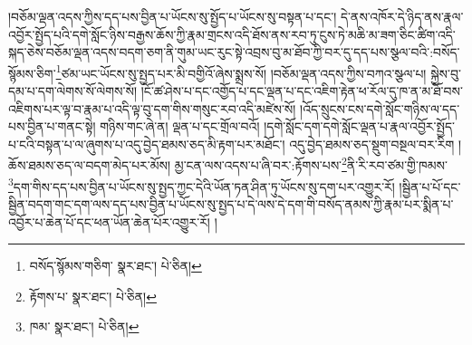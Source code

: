།བཅོམ་ལྡན་འདས་ཀྱིས་དད་པས་བྱིན་པ་ཡོངས་སུ་སྤྱོད་པ་ཡོངས་སུ་བསྟན་པ་དང་། དེ་ནས་འཁོར་དེ་ཉིད་ནས་རྣལ་འབྱོར་སྤྱོད་པའི་དགེ་སློང་ཉིས་བརྒྱས་ཆོས་ཀྱི་རྣམ་གྲངས་འདི་ཐོས་ནས་རབ་ཏུ་ངུས་ཏེ་མཆི་མ་ཟག་ཅིང་ཚིག་འདི་སྐད་ཅེས་བཅོམ་ལྡན་འདས་བདག་ཅག་ནི་གུམ་ཡང་རུང་སྟེ་འབྲས་བུ་མ་ཐོབ་ཀྱི་བར་དུ་དད་པས་སྩལ་བའི་:བསོད་སྙོམས་ཅིག་\footnote{བསོད་སྙོམས་གཅིག་  སྣར་ཐང་།  པེ་ཅིན། }ཙམ་ཡང་ཡོངས་སུ་སྤྱད་པར་མི་བགྱིའོ་ཞེས་སྨྲས་སོ། །བཅོམ་ལྡན་འདས་ཀྱིས་བཀའ་སྩལ་པ། སྐྱེས་བུ་དམ་པ་དག་ལེགས་སོ་ལེགས་སོ། །ངོ་ཚ་ཤེས་པ་དང་འགྱོད་པ་དང་ལྡན་པ་དང་འཇིག་རྟེན་ཕ་རོལ་དུ་ཁ་ན་མ་ཐོ་བས་འཇིགས་པར་ལྟ་བ་རྣམ་པ་འདི་ལྟ་བུ་དག་གིས་གསུང་རབ་འདི་མཛེས་སོ། །འོད་སྲུངས་ངས་དགེ་སློང་གཉིས་ལ་དད་པས་བྱིན་པ་གནང་སྟེ། གཉིས་གང་ཞེ་ན། ལྡན་པ་དང་གྲོལ་བའོ། །དགེ་སློང་དག་དགེ་སློང་ལྡན་པ་རྣལ་འབྱོར་སྤྱོད་པ་ངའི་བསྟན་པ་ལ་ཞུགས་པ་འདུ་བྱེད་ཐམས་ཅད་མི་རྟག་པར་མཐོང་། འདུ་བྱེད་ཐམས་ཅད་སྡུག་བསྔལ་བར་རིག །ཆོས་ཐམས་ཅད་ལ་བདག་མེད་པར་མོས། མྱ་ངན་ལས་འདས་པ་ཞི་བར་:རྟོགས་པས་\footnote{རྟོགས་པ་  སྣར་ཐང་།  པེ་ཅིན། }ནི་རི་རབ་ཙམ་གྱི་ཁམས་\footnote{ཁམ་  སྣར་ཐང་།  པེ་ཅིན། }དག་གིས་དད་པས་བྱིན་པ་ཡོངས་སུ་སྤྱད་ཀྱང་དེའི་ཡོན་ཏན་ཤིན་ཏུ་ཡོངས་སུ་དག་པར་འགྱུར་རོ། །སྦྱིན་པ་པོ་དང་སྦྱིན་བདག་གང་དག་ལས་དད་པས་བྱིན་པ་ཡོངས་སུ་སྤྱད་པ་དེ་ལས་དེ་དག་གི་བསོད་ནམས་ཀྱི་རྣམ་པར་སྨིན་པ་འབྱོར་པ་ཆེན་པོ་དང་ཕན་ཡོན་ཆེན་པོར་འགྱུར་རོ། །
